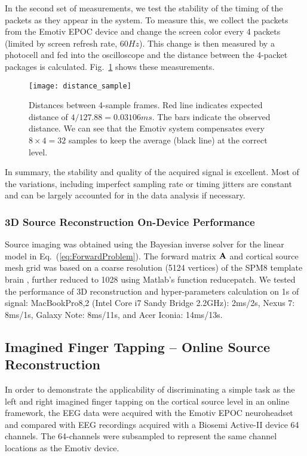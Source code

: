 \documentclass[10pt]{article}
\begin{document}
In the second set of measurements, we test the stability of the timing of the packets as they appear in the system. To measure this, we collect the packets from the Emotiv EPOC device and change the screen color every 4 packets (limited by screen refresh rate, $60Hz$). This change is then measured by a photocell and fed into the oscilloscope and the distance between the 4-packet packages is calculated. Fig.~\ref{figure_distance_4} shows these measurements.
\begin{figure}[!t]
\centering
\texttt{[image: distance\_sample]}
\caption{Distances between 4-sample frames. Red line indicates expected distance of $4/127.88 = 0.03106ms$. The bars indicate the observed distance. We can see that the Emotiv system compensates every $8 \times 4 = 32$ samples to keep the average (black line) at the correct level.}
\label{figure_distance_4}
\end{figure}
In summary, the stability and quality of the acquired signal is excellent. Most of the variations, including imperfect sampling rate or timing jitters are constant and can be largely accounted for in the data analysis if necessary.


		\subsubsection{3D Source Reconstruction On-Device Performance}
 
Source imaging was obtained using the Bayesian inverse solver for the linear model in Eq.\ (\ref{eq:ForwardProblem}). The forward matrix ${\bf A}$ and cortical source mesh grid was based on a coarse resolution (5124 vertices) of the SPM8 template brain \cite{litvak2011eeg}, further reduced to 1028 using Matlab's function reducepatch. We tested the performance of 3D reconstruction and hyper-parameters calculation on 1s of signal: MacBookPro8,2 (Intel Core i7 Sandy Bridge 2.2GHz): 2ms/2s, Nexus 7: 8ms/1s, Galaxy Note: 8ms/11s, and Acer Iconia: 14ms/13s.

	\subsection{Imagined Finger Tapping -- Online Source Reconstruction}
In order to demonstrate the applicability of discriminating a simple task as the left and right imagined finger tapping on the cortical source level in an online framework, the EEG data were acquired with the Emotiv EPOC neuroheadset and compared with EEG recordings acquired with a Biosemi Active-II device 64 channels. The 64-channels were subsampled to represent the same channel locations as the Emotiv device.
\end{document}
